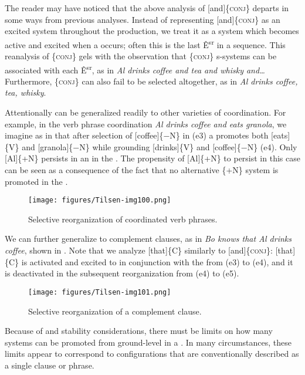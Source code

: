   The reader may have noticed that the above analysis of [and]\{\textsc{conj}\} departs in some ways from previous analyses. Instead of representing [and]\{\textsc{conj}\} as an excited system throughout the production, we treat it as a system which becomes active and excited when a  occurs; often this is the last Ê\textsuperscript{sr} in a sequence. This reanalysis of \{\textsc{conj}\} gels with the observation that \{\textsc{conj}\} s-systems can be associated with each Ê\textsuperscript{sr}, as in \textit{Al drinks coffee and tea and whisky and…} Furthermore, \{\textsc{conj}\} can also fail to be selected altogether, as in \textit{Al drinks coffee, tea, whisky}.

  Attentionally  can be generalized readily to other varieties of coordination. For example, in the verb phrase coordination \textit{Al drinks coffee and eats granola}, we imagine as in {} that after selection of [coffee]\{−N\} in (e3) a  promotes both [eats]\{V\} and [granola]\linebreak\{−N\} while grounding [drinks]\{V\} and [coffee]\{−N\} (e4). Only [Al]\{+N\} persists in an  in the . The propensity of [Al]\{+N\} to persist in this case can be seen as a consequence of the fact that no alternative \{+N\} system is promoted in the .

  
\begin{figure}
\texttt{[image: figures/Tilsen-img100.png]}
\caption{Selective reorganization of coordinated verb phrases.}
\label{fig:4:50}
\end{figure}
 

  We can further generalize  to complement clauses, as in \textit{Bo knows that Al drinks coffee}, shown in {}. Note that we analyze [that]\{C\} similarly to [and]\{\textsc{conj}\}: [that]\{C\} is activated and excited to  in conjunction with the  from (e3) to (e4), and it is deactivated in the subsequent reorganization from (e4) to (e5). 

  
\begin{figure}
\texttt{[image: figures/Tilsen-img101.png]}
\caption{Selective reorganization of a complement clause.}
\label{fig:4:51}
\end{figure}
 

  Because of  and stability considerations, there must be limits on how many systems can be promoted from ground-level in a . In many circumstances, these limits appear to correspond to configurations that are conventionally described as a single clause or  phrase.


